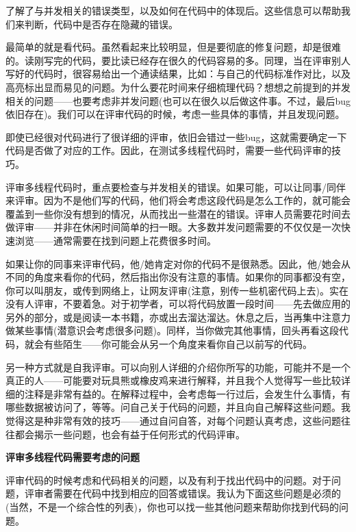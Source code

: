 
了解了与并发相关的错误类型，以及如何在代码中的体现后。这些信息可以帮助我们来判断，代码中是否存在隐藏的错误。

最简单的就是看代码。虽然看起来比较明显，但是要彻底的修复问题，却是很难的。读刚写完的代码，要比读已经存在很久的代码容易的多。同理，当在评审别人写好的代码时，很容易给出一个通读结果，比如：与自己的代码标准作对比，以及高亮标出显而易见的问题。为什么要花时间来仔细梳理代码？想想之前提到的并发相关的问题——也要考虑非并发问题(也可以在很久以后做这件事。不过，最后bug依旧存在)。我们可以在评审代码的时候，考虑一些具体的事情，并且发现问题。

即使已经很对代码进行了很详细的评审，依旧会错过一些bug，这就需要确定一下代码是否做了对应的工作。因此，在测试多线程代码时，需要一些代码评审的技巧。


评审多线程代码时，重点要检查与并发相关的错误。如果可能，可以让同事/同伴来评审。因为不是他们写的代码，他们将会考虑这段代码是怎么工作的，就可能会覆盖到一些你没有想到的情况，从而找出一些潜在的错误。评审人员需要花时间去做评审——并非在休闲时间简单的扫一眼。大多数并发问题需要的不仅仅是一次快速浏览——通常需要在找到问题上花费很多时间。

如果让你的同事来评审代码，他/她肯定对你的代码不是很熟悉。因此，他/她会从不同的角度来看你的代码，然后指出你没有注意的事情。如果你的同事都没有空，你可以叫朋友，或传到网络上，让网友评审(注意，别传一些机密代码上去)。实在没有人评审，不要着急。对于初学者，可以将代码放置一段时间——先去做应用的另外的部分，或是阅读一本书籍，亦或出去溜达溜达。休息之后，当再集中注意力做某些事情(潜意识会考虑很多问题)。同样，当你做完其他事情，回头再看这段代码，就会有些陌生——你可能会从另一个角度来看你自己以前写的代码。

另一种方式就是自我评审。可以向别人详细的介绍你所写的功能，可能并不是一个真正的人——可能要对玩具熊或橡皮鸡来进行解释，并且我个人觉得写一些比较详细的注释是非常有益的。在解释过程中，会考虑每一行过后，会发生什么事情，有哪些数据被访问了，等等。问自己关于代码的问题，并且向自己解释这些问题。我觉得这是种非常有效的技巧——通过自问自答，对每个问题认真考虑，这些问题往往都会揭示一些问题，也会有益于任何形式的代码评审。

\textbf{评审多线程代码需要考虑的问题}

评审代码的时候考虑和代码相关的问题，以及有利于找出代码中的问题。对于问题，评审者需要在代码中找到相应的回答或错误。我认为下面这些问题是必须的(当然，不是一个综合性的列表)，你也可以找一些其他问题来帮助你找到代码的问题。

